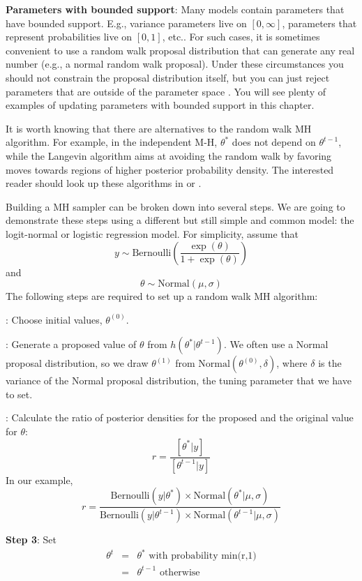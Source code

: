 {\bf Parameters with bounded support}: Many models contain parameters
that have bounded support. E.g., variance parameters live on
$[0,\infty]$, parameters that represent probabilities live on $[0,1]$,
etc..  For such cases, it is sometimes convenient to use a random walk
proposal distribution that can generate any real number (e.g., a
normal random walk proposal). Under these circumstances you should not
constrain the proposal distribution itself, but you can just reject
parameters that are outside of the parameter space
\citep{robert_casella:2010}. You will see plenty of examples of
updating parameters with bounded support in this chapter.

It is worth
knowing that there are alternatives to the random walk MH algorithm. For
example, in the independent M-H, $\theta^{*}$ does not depend on
$\theta^{t-1}$, while the Langevin algorithm \citep{roberts_etal:1998}
aims at avoiding the random walk by favoring moves towards regions of
higher posterior probability density. The interested reader should
look up these algorithms in \citet{robert_casella:2004} or
\citet{robert_casella:2010}.

Building a MH sampler can be broken down into several steps. We are going to demonstrate these steps using a different but still simple and common model: the logit-normal or logistic regression model. For simplicity, assume that
\[
y \sim \mbox{Bernoulli} \left(\frac{\exp(\theta)}{1+ \exp(\theta)}\right)
\]
and
\[
\theta \sim \mbox{Normal}(\mu, \sigma)
\]
The following steps are required to set up a random walk MH algorithm:

{: Choose initial values, $\theta^{(0)}$.}

{: Generate a proposed value of $\theta$ from $h(\theta^{*}|\theta^{t-1})$. }
We often use a Normal proposal distribution, so we draw $\theta^{(1)}$ from $\mbox{Normal}(\theta^{(0)}, \delta)$, where $\delta$ is the variance of the Normal proposal distribution, the tuning parameter that we have to set.

{: Calculate the ratio of posterior densities for the proposed and the original value for $\theta$: }
\[
r = \frac{[\theta^{*}|y]}  {[\theta^{t-1}|y]}
\]
In our example,
\[
r = \frac{\mbox{Bernoulli}(y|\theta^{*}) \times \mbox{Normal}(\theta^{*}|\mu, \sigma)} {\mbox{Bernoulli}(y|\theta^{t-1}) \times \mbox{Normal}(\theta^{t-1}|\mu, \sigma)}
\]


{\bf Step 3}: Set
\begin{eqnarray*}
\theta^t  &= &   \theta^{*} \mbox{ with probability min(r,1)}\\
	 & = & 	\theta^{t-1} \mbox{ otherwise }
\end{eqnarray*}


